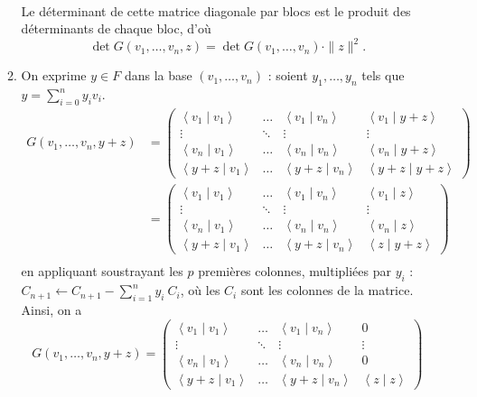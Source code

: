 \documentclass[a4paper]{article}
\begin{document}
\begin{enumerate}
\begin{enumerate}
\begin{align*}
					\end{align*}
					Le déterminant de cette matrice diagonale par blocs est le produit des déterminants de chaque bloc, d'où \[
						\det G(v_1, \ldots, v_n, z) = \det G(v_1, \ldots, v_n) \cdot \|z\|^2
					.\]
				\item On exprime $y \in F$\/ dans la base $(v_1, \ldots, v_n)$\/ : soient $y_1, \ldots, y_n$\/ tels que $y = \sum_{i=0}^n y_i v_i$.
					\begin{align*}
						G(v_1, \ldots, v_n, y+z) &= \begin{pmatrix}
							\left<v_1 \mid v_1 \right> & \ldots & \left<v_1 \mid v_n \right> & \left<v_1 \mid y + z \right>\\
							\vdots & \ddots & \vdots & \vdots\\
							\left<v_n  \mid v_1 \right> & \ldots & \left<v_n  \mid v_n \right> & \left<v_n  \mid y + z \right>\\
							\left<y+z  \mid v_1 \right> & \ldots & \left<y+z  \mid v_n \right> & \left<y + z  \mid y + z \right>
						\end{pmatrix}\\
						&= \begin{pmatrix}
							\left<v_1 \mid v_1 \right> & \ldots & \left<v_1 \mid v_n \right> & \left<v_1 \mid z \right>\\
							\vdots & \ddots & \vdots & \vdots\\
							\left<v_n  \mid v_1 \right> & \ldots & \left<v_n  \mid v_n \right> & \left<v_n  \mid z \right>\\
							\left<y+z  \mid v_1 \right> & \ldots & \left<y+z  \mid v_n \right> & \left<z  \mid y + z \right>
						\end{pmatrix}\\
					\end{align*}
					en appliquant soustrayant les $p$\/ premières colonnes, multipliées par $y_i$\/ : $C_{n+1} \gets C_{n+1} - \sum_{i=1}^n y_i\:C_i$, où les $C_i$\/ sont les colonnes de la matrice.
					Ainsi, on a \[
						G(v_1, \ldots, v_n, y + z)
						= \begin{pmatrix}
							\left<v_1 \mid v_1 \right> & \ldots & \left<v_1 \mid v_n \right> & 0\\
							\vdots & \ddots & \vdots & \vdots\\
							\left<v_n  \mid v_1 \right> & \ldots & \left<v_n  \mid v_n \right> & 0\\
							\left<y+z  \mid v_1 \right> & \ldots & \left<y+z  \mid v_n \right> & \left<z \mid z \right>
						\end{pmatrix}
\]
\end{enumerate}
\end{enumerate}
\end{document}
